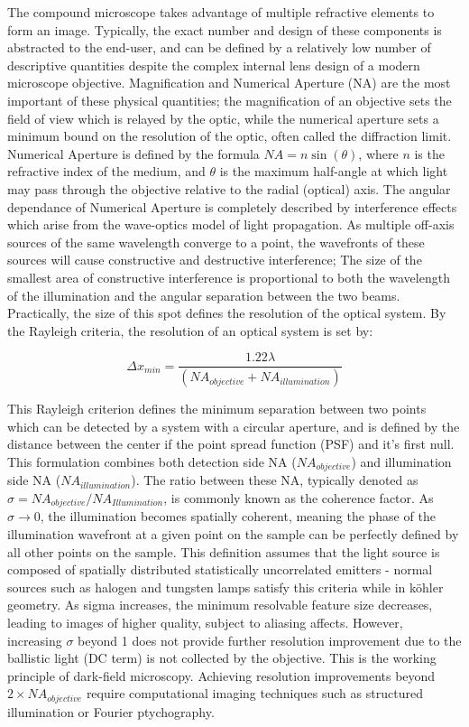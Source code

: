 The compound microscope takes advantage of multiple refractive elements to form an image. Typically, the exact number and design of these components is abstracted to the end-user, and can be defined by a relatively low number of descriptive quantities despite the complex internal lens design of a modern microscope objective. Magnification and Numerical Aperture (NA) are the most important of these physical quantities; the magnification of an objective sets the field of view which is relayed by the optic, while the numerical aperture sets a minimum bound on the resolution of the optic, often called the diffraction limit. Numerical Aperture is defined by the formula $NA=n\sin (\theta)$, where $n$ is the refractive index of the medium, and $\theta$ is the maximum half-angle at which light may pass through the objective relative to the radial (optical) axis. The angular dependance of Numerical Aperture is completely described by interference effects which arise from the wave-optics model of light propagation. As multiple off-axis sources of the same wavelength converge to a point, the wavefronts of these sources will cause constructive and destructive interference; The size of the smallest area of constructive interference is proportional to both the wavelength of the illumination and the angular separation between the two beams. Practically, the size of this spot defines the resolution of the optical system. By the Rayleigh criteria, the resolution of an optical system is set by:

\begin{equation}
\Delta x_{min}  = \frac{1.22 \lambda}{(NA_{objective} + NA_{illumination})}
\end{equation}

This Rayleigh criterion defines the minimum separation between two points which can be detected by a system with a circular aperture, and is defined by the distance between the center if the point spread function (PSF) and it's first null. This formulation combines both detection side NA ($NA_{objective}$) and illumination side NA ($NA_{illumination}$). The ratio between these NA, typically denoted as $\sigma = NA_{objective}/NA_{Illumination}$, is commonly known as the coherence factor. As $\sigma \longrightarrow 0 $, the illumination becomes spatially coherent, meaning the phase of the illumination wavefront at a given point on the sample can be perfectly defined by all other points on the sample. This definition assumes that the light source is composed of spatially distributed statistically uncorrelated emitters - normal sources such as halogen and tungsten lamps satisfy this criteria while in k{\"o}hler geometry. As sigma increases, the minimum resolvable feature size decreases, leading to images of higher quality, subject to aliasing affects. However, increasing $\sigma$ beyond 1 does not provide further resolution improvement due to the ballistic light (DC term) is not collected by the objective. This is the working principle of dark-field microscopy. Achieving resolution improvements beyond $2\times NA_{objective}$  require computational imaging techniques such as structured illumination \cite{gustafsson2000surpassing} or Fourier ptychography\cite{Zheng2013}.

